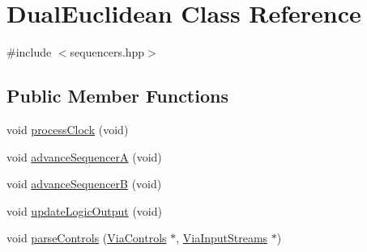 \hypertarget{class_dual_euclidean}{}\section{Dual\+Euclidean Class Reference}
\label{class_dual_euclidean}


{\ttfamily \#include $<$sequencers.\+hpp$>$}

\subsection*{Public Member Functions}
\begin{DoxyCompactItemize}
\item 
void \mbox{\hyperlink{class_dual_euclidean_a546f3720e1120c3ff547f330287fefde}{process\+Clock}} (void)
\item 
void \mbox{\hyperlink{class_dual_euclidean_adfa104faaaa81723ec6e3ce1f3f70d92}{advance\+SequencerA}} (void)
\item 
void \mbox{\hyperlink{class_dual_euclidean_a84bd2974dc771fde961db2e81797916f}{advance\+SequencerB}} (void)
\item 
void \mbox{\hyperlink{class_dual_euclidean_afed6b5eb3ac657c75b1d158ee53d1d84}{update\+Logic\+Output}} (void)
\item 
void \mbox{\hyperlink{class_dual_euclidean_ab18b3a9c1a51e7f47d6fc3c6fd26ef4a}{parse\+Controls}} (\mbox{\hyperlink{class_via_controls}{Via\+Controls}} $\ast$, \mbox{\hyperlink{class_via_input_streams}{Via\+Input\+Streams}} $\ast$)
\end{DoxyCompactItemize}
